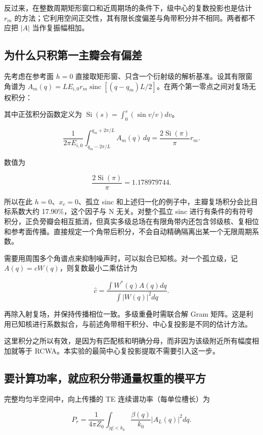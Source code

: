\documentclass[
  chinese,
  UTF8,
  a4paper,
  11pt]{ctexart}
\begin{document}
反过来，在整数周期矩形窗口和近周期场的条件下，级中心的复数投影也是估计
\(r_m\)
的方法；它利用空间正交性，其有限长度偏差与角带积分并不相同。两者都不应把
\(|A|\) 当作复振幅相加。

\subsection{为什么只积第一主瓣会有偏差}\label{ux4e3aux4ec0ux4e48ux53eaux79efux7b2cux4e00ux4e3bux74e3ux4f1aux6709ux504fux5dee}

先考虑在参考面 \(h=0\)
直接取矩形窗、只含一个衍射级的解析基准。设其有限窗角谱为
\(A_m(q)=L E_{i,0}r_m\operatorname{sinc}[(q-q_m)L/2]\)。在两个第一零点之间对复场无权积分：

其中正弦积分函数定义为 \(\operatorname{Si}(s)=\int_0^s(\sin v/v)dv\)。

\[\frac{1}{2\pi E_{i,0}}\int_{q_m-2\pi/L}^{q_m+2\pi/L}A_m(q)\,dq=\frac{2\operatorname{Si}(\pi)}{\pi}r_m.\]

数值为

\[\frac{2\operatorname{Si}(\pi)}{\pi}=1.178979744.\]

所以在此 \(h=0\)、\(x_c=0\)、孤立 sinc
和上述归一化的例子中，主瓣复场积分会比目标系数大约 17.90\%，这个因子与 N
无关。对整个孤立 sinc
进行有条件的有符号积分，正负旁瓣会相互抵消，但真实多级总场在有限角带内还包含邻级核、复相位和参考面传播。直接规定一个角带后积分，不会自动精确隔离出某一个无限周期系数。

需要用周围多个角谱点来抑制噪声时，可以拟合已知核。对一个孤立级，记
\(A(q)=cW(q)\)，则复数最小二乘估计为

\[\widehat c=\frac{\int W^*(q)A(q)dq}{\int |W(q)|^2dq}.\]

再除入射复场，并保持传播相位一致。多级重叠时需联合解 Gram
矩阵。这是利用已知核进行系数拟合，与前述角带相干积分、中心复投影是不同的估计方法。

这里积分之所以有效，是因为有匹配核和明确分母，而非因为该级附近所有幅度相加就等于
RCWA。本实验的最简中心复投影提取不需要引入这一步。

\subsection{要计算功率，就应积分带通量权重的模平方}\label{ux8981ux8ba1ux7b97ux529fux7387ux5c31ux5e94ux79efux5206ux5e26ux901aux91cfux6743ux91cdux7684ux6a21ux5e73ux65b9}

完整均匀半空间中，向上传播的 TE 连续谱功率（每单位槽长）为

\[P_r=\frac{1}{4\pi Z_0}\int_{|q|<k_0}\frac{\beta(q)}{k_0}|A_L(q)|^2dq.\]
\end{document}
